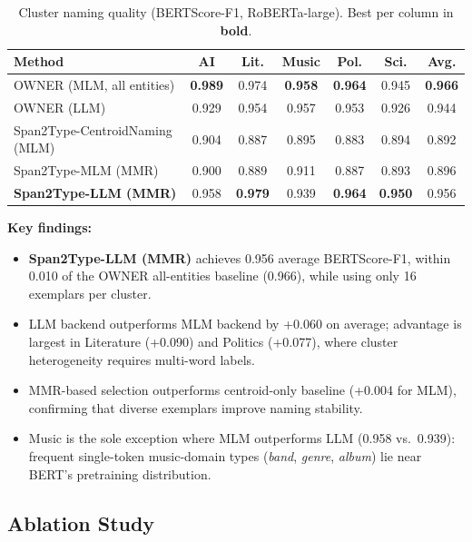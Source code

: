 \documentclass[11pt,a4paper]{article}
\begin{document}
\begin{table}[H]
\centering
\footnotesize
\caption{Cluster naming quality (BERTScore-F1, RoBERTa-large). Best per column in \textbf{bold}.}
\label{tab:naming}
\begin{tabular}{l|c|c|c|c|c|c}
\toprule
\textbf{Method} & \textbf{AI} & \textbf{Lit.} & \textbf{Music} & \textbf{Pol.} & \textbf{Sci.} & \textbf{Avg.} \\
\midrule
OWNER (MLM, all entities)       & \textbf{0.989} & 0.974 & \textbf{0.958} & \textbf{0.964} & 0.945 & \textbf{0.966} \\
OWNER (LLM)                     & 0.929 & 0.954 & 0.957 & 0.953 & 0.926 & 0.944 \\
Span2Type-CentroidNaming (MLM)  & 0.904 & 0.887 & 0.895 & 0.883 & 0.894 & 0.892 \\
Span2Type-MLM (MMR)             & 0.900 & 0.889 & 0.911 & 0.887 & 0.893 & 0.896 \\
\textbf{Span2Type-LLM (MMR)}    & 0.958 & \textbf{0.979} & 0.939 & \textbf{0.964} & \textbf{0.950} & 0.956 \\
\bottomrule
\end{tabular}
\end{table}

\textbf{Key findings:}
\begin{itemize}[noitemsep]
  \item \textbf{Span2Type-LLM (MMR)} achieves 0.956 average BERTScore-F1, within 0.010 of the OWNER all-entities baseline (0.966), while using only 16 exemplars per cluster.
  \item LLM backend outperforms MLM backend by +0.060 on average; advantage is largest in Literature (+0.090) and Politics (+0.077), where cluster heterogeneity requires multi-word labels.
  \item MMR-based selection outperforms centroid-only baseline (+0.004 for MLM), confirming that diverse exemplars improve naming stability.
  \item Music is the sole exception where MLM outperforms LLM (0.958 vs.\ 0.939): frequent single-token music-domain types (\textit{band}, \textit{genre}, \textit{album}) lie near BERT's pretraining distribution.
\end{itemize}

\subsection{Ablation Study}
\end{document}
